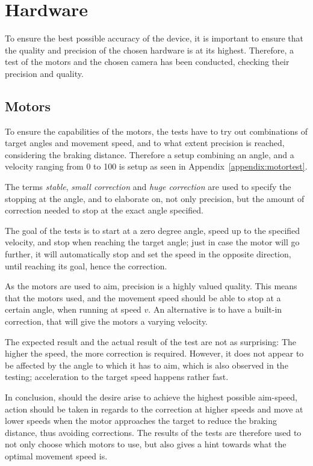 \section{Hardware}\label{des:sec:hwtest}
To ensure the best possible accuracy of the device, it is important to ensure that the quality and precision of the chosen hardware is at its highest.
Therefore, a test of the motors and the chosen camera has been conducted, checking their precision and quality.

\subsection*{Motors}
To ensure the capabilities of the motors, the tests have to try out combinations of target angles and movement speed, and to what extent precision is reached, considering the braking distance.
Therefore a setup combining an angle, and a velocity ranging from 0 to 100 is setup as seen in Appendix~\ref{appendix:motortest}.

The terms \textit{stable}, \textit{small correction} and \textit{huge correction} are used to specify the stopping at the angle, and to elaborate on, not only precision, but the amount of correction needed to stop at the exact angle specified.

The goal of the tests is to start at a zero degree angle, speed up to the specified velocity, and stop when reaching the target angle; just in case the motor will go further, it will automatically stop and set the speed in the opposite direction, until reaching its goal, hence the correction.

As the motors are used to aim, precision is a highly valued quality.
This means that the motors used, and the movement speed should be able to stop at a certain angle, when running at speed $v$.
An alternative is to have a built-in correction, that will give the motors a varying velocity.

The expected result and the actual result of the test are not as surprising: The higher the speed, the more correction is required.
However, it does not appear to be affected by the angle to which it has to aim, which is also observed in the testing; acceleration to the target speed happens rather fast.

In conclusion, should the desire arise to achieve the highest possible aim-speed, action should be taken in regards to the correction at higher speeds and move at lower speeds when the motor approaches the target to reduce the braking distance, thus avoiding corrections.
The results of the tests are therefore used to not only choose which motors to use, but also gives a hint towards what the optimal movement speed is.

